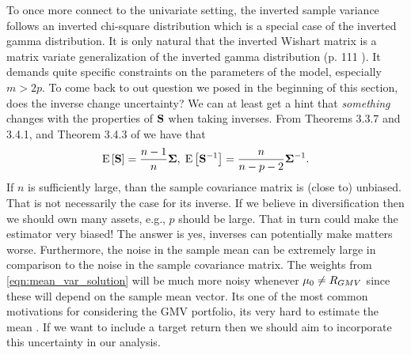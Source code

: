 \documentclass[oneside]{book}\usepackage{knitr}
\begin{document}
To once more connect to the univariate setting, the inverted sample variance follows an inverted chi-square distribution which is a special case of the inverted gamma distribution.
It is only natural that the inverted Wishart matrix is a matrix variate generalization of the inverted gamma distribution (p. 111 \citet{GuptaNagar2000}). 
It demands quite specific constraints on the parameters of the model, especially $m > 2p$.
To come back to out question we posed in the beginning of this section, does the inverse change uncertainty? 
We can at least get a hint that \textit{something} changes with the properties of $\mathbf{S}$ when taking inverses.
From Theorems 3.3.7 and 3.4.1, and Theorem 3.4.3 of \citet{GuptaNagar2000} we have that
$$
\operatorname{E}\left[\mathbf{S}\right] = \frac{n-1}{n} \mathbf{\Sigma}, \; 
\operatorname{E}\left[\mathbf{S}^{-1}\right] = \frac{n}{n-p-2}\mathbf{\Sigma}^{-1}.
$$
If $n$ is sufficiently large, than the sample covariance matrix is (close to) unbiased.
That is not necessarily the case for its inverse.
If we believe in diversification then we should own many assets, e.g., $p$ should be large. 
That in turn could make the estimator very biased!
The answer is yes, inverses can potentially make matters worse.
Furthermore, the noise in the sample mean can be extremely large in comparison to the noise in the sample covariance matrix.
The weights from \eqref{eqn:mean_var_solution} will be much more noisy whenever $\mu_0 \neq R_{GMV}$ since these will depend on the sample mean vector. 
Its one of the most common motivations for considering the GMV portfolio, its very hard to estimate the mean \citep{golosnoy2019exponential}.  
If we want to include a target return then we should aim to incorporate this uncertainty in our analysis.
\end{document}
